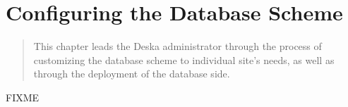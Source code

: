 \documentclass[deska]{subfiles}
\begin{document}
\chapter{Configuring the Database Scheme}
\label{sec:admin-dbscheme}

\begin{abstract}
This chapter leads the Deska administrator through the process of customizing the database scheme to individual site's
needs, as well as through the deployment of the database side.
\end{abstract}

\label{sec:db-scheme-req}
FIXME
\end{document}
